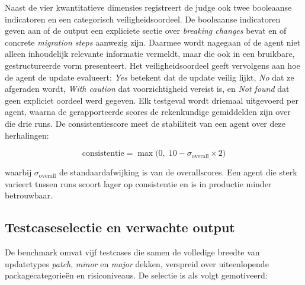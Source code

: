 Naast de vier kwantitatieve dimensies registreert de judge ook twee booleaanse indicatoren en een categorisch veiligheidsoordeel. De booleaanse indicatoren geven aan of de output een expliciete sectie over \textit{breaking changes} bevat en of concrete \textit{migration steps} aanwezig zijn. Daarmee wordt nagegaan of de agent niet alleen inhoudelijk relevante informatie vermeldt, maar die ook in een bruikbare, gestructureerde vorm presenteert. Het veiligheidsoordeel geeft vervolgens aan hoe de agent de update evalueert: \textit{Yes} betekent dat de update veilig lijkt, \textit{No} dat ze afgeraden wordt, \textit{With caution} dat voorzichtigheid vereist is, en \textit{Not found} dat geen expliciet oordeel werd gegeven. Elk testgeval wordt driemaal uitgevoerd per agent, waarna de gerapporteerde scores de rekenkundige gemiddelden zijn over die drie runs. De consistentiescore meet de stabiliteit van een agent over deze herhalingen:

\begin{equation}
    \text{consistentie} = \max\bigl(0,\; 10 - \sigma_{\text{overall}} \times 2\bigr)
    \label{eq:consistentie}
\end{equation}

waarbij $\sigma_{\text{overall}}$ de standaardafwijking is van de overallscores. Een agent die sterk varieert tussen runs scoort lager op consistentie en is in productie minder betrouwbaar.

\subsection{Testcaseselectie en verwachte output}
\label{subsec:testcases}

De benchmark omvat vijf testcases die samen de volledige breedte van updatetypes \textit{patch}, \textit{minor} en \textit{major} dekken, verspreid over uiteenlopende packagecategorieën en risiconiveaus. De selectie is als volgt gemotiveerd:

